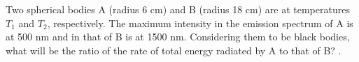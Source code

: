 
\item Two spherical bodies A (radius 6 cm) and B (radius 18 cm) are at temperatures \(T_1\) and \(T_2\), respectively. The maximum intensity in the emission spectrum of A is at 500 nm and in that of B is at 1500 nm. Considering them to be black bodies, what will be the ratio of the rate of total energy radiated by A to that of B? \underline{\hspace{2.5cm}}.
